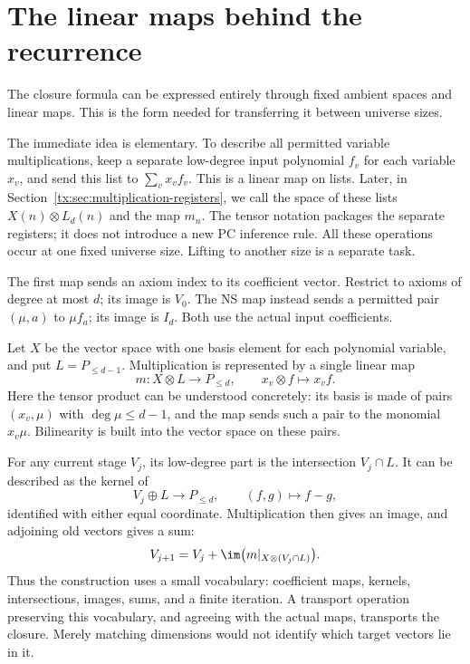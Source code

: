 \documentclass[11pt,a4paper,oneside,openany]{book}
\theoremstyle{definition}\newtheorem{definition}[theorem]{Definition}
\theoremstyle{remark}\newtheorem{remark}[theorem]{Remark}
\numberwithin{equation}{chapter}
\begin{document}
\section{The linear maps behind the recurrence}
The closure formula can be expressed entirely through fixed ambient
spaces and linear maps. This is the form needed for transferring it
between universe sizes.

The immediate idea is elementary. To describe all permitted variable
multiplications, keep a separate low-degree input polynomial $f_v$
for each variable $x_v$, and send this list to $\sum_v x_vf_v$.
This is a linear map on lists. Later, in
Section~\ref{tx:sec:multiplication-registers}, we call the space of
these lists $X(n)\otimes L_d(n)$ and the map $m_n$.
The tensor notation packages the separate registers; it does not
introduce a new PC inference rule. All these operations occur at
one fixed universe size. Lifting to another size is a separate task.

The first map sends an axiom index to its coefficient vector. Restrict
to axioms of degree at most $d$; its image is $V_0$. The NS map instead
sends a permitted pair $(\mu,a)$ to $\mu f_a$; its image is $I_d$.
Both use the actual input coefficients.

Let $X$ be the vector space with one basis element for each polynomial
variable, and put $L=P_{\le d-1}$. Multiplication is represented by a
single linear map
\[
              m:X\otimes L\longrightarrow P_{\le d},
                         \qquad x_v\otimes f\longmapsto x_vf.
\]
Here the tensor product can be understood concretely: its basis is
made of pairs $(x_v,\mu)$ with $\deg\mu\le d-1$, and the map sends
such a pair to the monomial $x_v\mu$. Bilinearity is built into the
vector space on these pairs.

For any current stage $V_j$, its low-degree part is the intersection
$V_j\cap L$. It can be described as the kernel of
\[
                  V_j\oplus L\longrightarrow P_{\le d},
                              \qquad(f,g)\longmapsto f-g,
\]
identified with either equal coordinate. Multiplication then gives an
image, and adjoining old vectors gives a sum:
\[
 V_{j+1}=V_j+\im\bigl(m|_{X\otimes(V_j\cap L)}\bigr).
\]
Thus the construction uses a small vocabulary: coefficient maps,
kernels, intersections, images, sums, and a finite iteration. A
transport operation preserving this vocabulary, and agreeing with the
actual maps, transports the closure. Merely matching dimensions would
not identify which target vectors lie in it.
\end{document}
